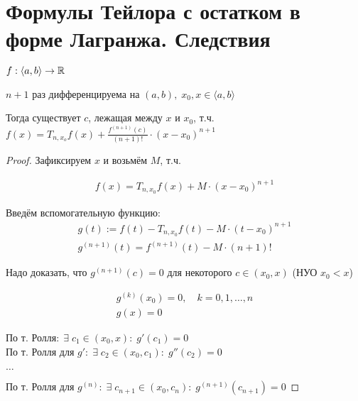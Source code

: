 
\section{Формулы Тейлора с остатком в форме Лагранжа. Следствия}

\begin{theorem-non}
    $f: \langle a, b \rangle \rightarrow \mathbb{R}$

    $n + 1$ раз дифференцируема на $(a, b), \; x_0, x \in 
    \langle a, b \rangle$

    Тогда существует $c$, лежащая между $x$ и $x_0$, т.ч.
    $f(x) = T_{n,x_o} f(x) + \frac{f^{(n+1)}(c)}{(n+1)!} \cdot (x - x_0)^{n+1}$

    \begin{proof}
        Зафиксируем $x$ и возьмём $M$, т.ч.
        
        \begin{gather*}
            f(x) = T_{n,x_0} f(x) + M \cdot (x - x_0)^{n+1}
        \end{gather*}

        Введём вспомогательную функцию:
        \begin{gather*}
            g(t) := f(t) - T_{n, x_0}f(t) - M \cdot (t - x_0)^{n+1} \\
            g^{(n+1)}(t) = f^{(n+1)}(t) - M \cdot (n + 1)!
        \end{gather*}
        
        Надо доказать, что $g^{(n+1)}(c) = 0$ для некоторого $c \in (x_0, x)$ (НУО $x_0 < x$)

        \begin{gather*}
            g^{(k)}(x_0) = 0, \quad k = 0,1, \dots, n \\
            g(x) = 0
        \end{gather*}
        
        По т. Ролля$: \; \exists \; c_1 \in (x_0, x): \; g'(c_1) = 0$ \\
        По т. Ролля для $g': \; \exists \; c_2 \in (x_0, c_1): \; g''(c_2) = 0$

        $\dots$

        По т. Ролля для $g^{(n)}: \; \exists \; c_{n+1} \in (x_0, c_n): \; g^{(n+1)}(c_{n+1}) = 0$

    \end{proof}

\end{theorem-non}

